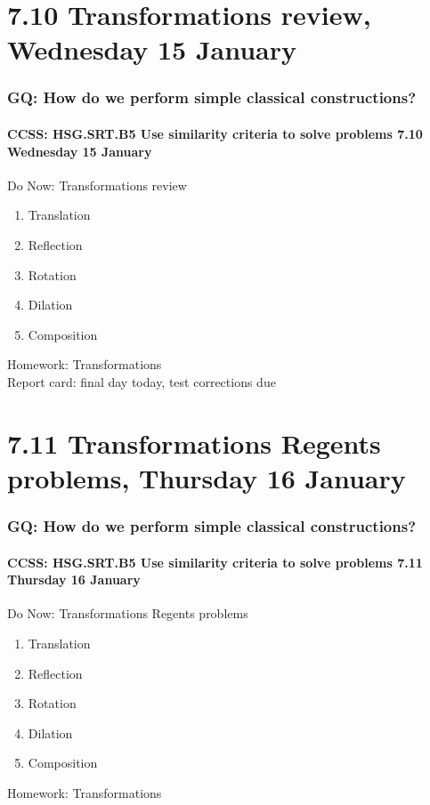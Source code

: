 \documentclass{beamer}
\begin{document}
\section{7.10 Transformations review, Wednesday 15 January}
\frame
{
  \frametitle{GQ: How do we perform simple classical constructions?}
  \framesubtitle{CCSS: HSG.SRT.B5 Use similarity criteria to solve problems \hfill \alert{7.10 Wednesday 15 January}}

  \begin{block}{Do Now: Transformations review}
  \begin{enumerate}
    \item Translation
    \item Reflection
    \item Rotation
    \item Dilation
    \item Composition
  \end{enumerate}
  \end{block}
  Homework: Transformations \\[0.25cm]
  \alert{Report card: final day today, test corrections due}
}

\section{7.11 Transformations Regents problems, Thursday 16 January}
\frame
{
  \frametitle{GQ: How do we perform simple classical constructions?}
  \framesubtitle{CCSS: HSG.SRT.B5 Use similarity criteria to solve problems \hfill \alert{7.11 Thursday 16 January}}

  \begin{block}{Do Now: Transformations Regents problems}
  \begin{enumerate}
    \item Translation
    \item Reflection
    \item Rotation
    \item Dilation
    \item Composition
  \end{enumerate}
  \end{block}
  Homework: Transformations
}
\end{document}
